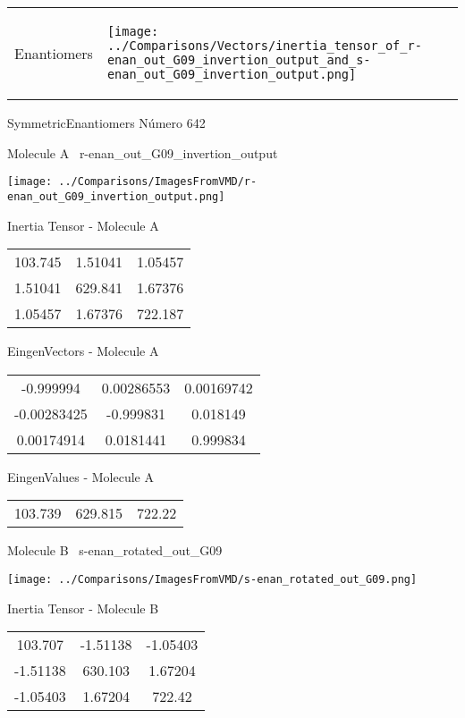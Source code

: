 \vtab[-5mm]
\begin{tabular}{*{2}{m{}}}
\begin{center}
\textcolor{NavyBlue}{\Large Enantiomers}
\end{center}
&
\begin{center}
\texttt{[image: ../Comparisons/Vectors/inertia\_tensor\_of\_r-enan\_out\_G09\_invertion\_output\_and\_s-enan\_out\_G09\_invertion\_output.png]}
\end{center}
\end{tabular}

 \newpage

\vtab[-3cm]
\begin{center}
{\large SymmetricEnantiomers \tab Número 642}
\end{center}
\begin{multicols}{2}
\begin{center}

Molecule A \
r-enan\_out\_G09\_invertion\_output

\texttt{[image: ../Comparisons/ImagesFromVMD/r-enan\_out\_G09\_invertion\_output.png]}

Inertia Tensor - Molecule A \\
\begin{tabular}{|c c c|}
103.745	 & 	1.51041	 & 	1.05457	 \\
1.51041	 & 	629.841	 & 	1.67376	 \\
1.05457	 & 	1.67376	 & 	722.187
\end{tabular}

\vtab
 EingenVectors - Molecule A     \\
\begin{tabular}{|c c c|}
-0.999994	 & 	0.00286553	 & 	0.00169742	 \\
-0.00283425	 & 	-0.999831	 & 	0.018149	 \\
0.00174914	 & 	0.0181441	 & 	0.999834
\end{tabular}

\vtab
 EingenValues - Molecule A     \\
\begin{tabular}{|c c c|}
103.739	 & 	629.815	 & 	722.22	 \\
\end{tabular}
\columnbreak

Molecule B \
s-enan\_rotated\_out\_G09

\texttt{[image: ../Comparisons/ImagesFromVMD/s-enan\_rotated\_out\_G09.png]}

Inertia Tensor - Molecule B \\
\begin{tabular}{|c c c|}
103.707	 & 	-1.51138	 & 	-1.05403	 \\
-1.51138	 & 	630.103	 & 	1.67204	 \\
-1.05403	 & 	1.67204	 & 	722.42
\end{tabular}


\end{center}
\end{multicols}
